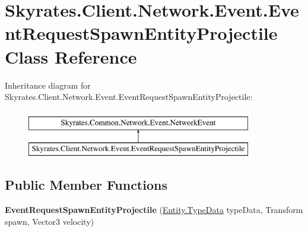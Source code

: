 \hypertarget{class_skyrates_1_1_client_1_1_network_1_1_event_1_1_event_request_spawn_entity_projectile}{\section{Skyrates.\-Client.\-Network.\-Event.\-Event\-Request\-Spawn\-Entity\-Projectile Class Reference}
\label{class_skyrates_1_1_client_1_1_network_1_1_event_1_1_event_request_spawn_entity_projectile}
}
Inheritance diagram for Skyrates.\-Client.\-Network.\-Event.\-Event\-Request\-Spawn\-Entity\-Projectile\-:\begin{figure}[H]
\begin{center}
\leavevmode
\includegraphics[height=2.000000cm]{class_skyrates_1_1_client_1_1_network_1_1_event_1_1_event_request_spawn_entity_projectile}
\end{center}
\end{figure}
\subsection*{Public Member Functions}
\begin{DoxyCompactItemize}
\item 
\hypertarget{class_skyrates_1_1_client_1_1_network_1_1_event_1_1_event_request_spawn_entity_projectile_ac350f5fb8fd6eee50bae58a6b20b7559}{{\bfseries Event\-Request\-Spawn\-Entity\-Projectile} (\hyperlink{class_skyrates_1_1_common_1_1_entity_1_1_entity_1_1_type_data}{Entity.\-Type\-Data} type\-Data, Transform spawn, Vector3 velocity)}\label{class_skyrates_1_1_client_1_1_network_1_1_event_1_1_event_request_spawn_entity_projectile_ac350f5fb8fd6eee50bae58a6b20b7559}

\end{DoxyCompactItemize}
